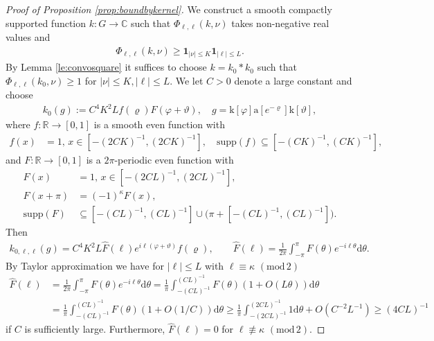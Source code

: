 \documentclass[12pt]{amsart}
\theoremstyle{definition}
\theoremstyle{remark}
\numberwithin{equation}{section}
\newcommand{\C}{{\mathbb C}}
\newcommand{\R}{{\mathbb R}}
\newcommand{\1}{{\mathbf 1}}
\renewcommand{\a}{\mathrm{a}}
\renewcommand{\k}{\mathrm{k}}
\renewcommand{\d}{\mathrm d}
\renewcommand{\pmod}[1]{\,\,(\mathrm{mod}\,{#1})}
\begin{document}
 \begin{proof}[Proof of Proposition \ref{prop:boundbykernel}]
 We construct a smooth compactly supported function $k:G\to\C$ such that $ \Phi_{\ell,\ell}(k,\nu)$ takes non-negative real values and
 \begin{align*}
      \Phi_{\ell,\ell}(k,\nu) \geq \mathbf{1}_{|\nu| \leq K} \mathbf{1}_{|\ell| \leq L}.
 \end{align*}
By Lemma \ref{le:convosquare} it suffices to choose $k=k_0*k_0$ such that $\Phi_{\ell,\ell}(k_0,\nu)\geq 1$ for $|\nu|\leq K, |\ell| \leq L$. 
 We let $C>0$ denote a large constant and choose
 \begin{align*}
     k_0(g) :=  C^4 K^2 L f(\varrho)  F(\varphi + \vartheta), \quad g = \k[\varphi]\a[e^{-\varrho}] \k[\vartheta],
 \end{align*}
where $f:\R \to [0,1]$ is a smooth even function with
\begin{align*}
   f(x)&=1, \, x \in  [-(2CK)^{-1},(2CK)^{-1}],\quad  \mathrm{supp}(f) \subseteq  [-(CK)^{-1},(CK)^{-1}],
\end{align*}
and $F:\R \to [0,1]$ is a $2\pi$-periodic even function with
\begin{align*}
       F(x)&=1, \, x \in  [-(2CL)^{-1},(2CL)^{-1}], \\
        F(x+\pi)&=(-1)^\kappa F(x),  \\
       \mathrm{supp}(F) &\subseteq [-(CL)^{-1},(CL)^{-1}] \cup \bigg(\pi + [-(CL)^{-1},(CL)^{-1}]\bigg).
\end{align*}
Then 
\begin{align*}
    k_{0,\ell,\ell}(g) = C^4 K^2 L \widehat{F}(\ell) e^{i\ell (\varphi + \vartheta)} f(\varrho), \quad \quad  \widehat{F}(\ell) = \frac{1}{2\pi}\int_{-\pi}^{\pi} F(\theta) e^{-i\ell \theta} \d \theta.
\end{align*}
By Taylor approximation we have for $|\ell| \leq L$ with $\ell \equiv \kappa \pmod{2}$
\begin{align*}
    \widehat{F}(\ell) &= \frac{1}{2\pi}\int_{-\pi}^{\pi} F(\theta) e^{-i\ell \theta} \d \theta =   \frac{1}{\pi}\int_{-(CL)^{-1}}^{(CL)^{-1}} F(\theta) (1+O( L \theta )) \d \theta   \\&=  \frac{1}{\pi}\int_{-(CL)^{-1}}^{(CL)^{-1}} F(\theta) (1+O( 1/C )) \d \theta  
    \geq  \frac{1}{\pi}\int_{-(2CL)^{-1}}^{(2CL)^{-1}} 1 \d \theta + O(C^{-2} L^{-1})  \geq (4C L)^{-1}
\end{align*}
if $C$ is sufficiently large. Furthermore, $  \widehat{F}(\ell) = 0$ for $\ell \not \equiv \kappa \pmod{2}$.


\end{proof}
\end{document}
